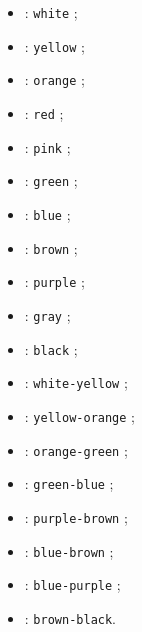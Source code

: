 \documentclass[english,11pt,a4paper]{article}
\begin{document}
\begin{itemize}
	\item {} : \texttt{white} ;
	\item {}  : \texttt{yellow} ;
	\item {}  : \texttt{orange} ;
	\item {}  : \texttt{red} ;
	\item {}  : \texttt{pink} ;
	\item {}  : \texttt{green} ;
	\item {}  : \texttt{blue} ;
	\item {}  : \texttt{brown} ;
	\item {}  : \texttt{purple} ;
	\item {}  : \texttt{gray} ;
	\item {}  : \texttt{black} ;
	\item {}  : \texttt{white-yellow} ;
	\item {}  : \texttt{yellow-orange} ;
	\item {}  : \texttt{orange-green} ;
	\item {}  : \texttt{green-blue} ;
	\item {}  : \texttt{purple-brown} ;
	\item {}  : \texttt{blue-brown} ;
	\item {}  : \texttt{blue-purple} ;
	\item {}  : \texttt{brown-black}.
\end{itemize}

\medskip
\end{document}
